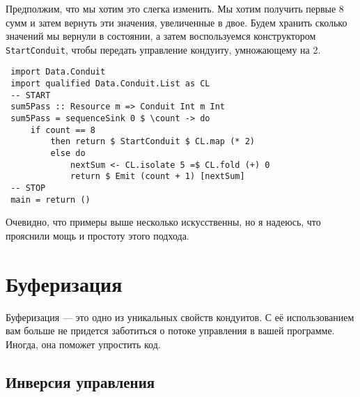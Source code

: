 Предполжим, что мы хотим это слегка изменить. Мы хотим получить первые 8 сумм и 
затем вернуть эти значения, увеличенные в двое. Будем хранить сколько значений 
мы вернули в состоянии, а затем воспользуемся конструктором 
\lstinline'StartConduit', чтобы передать управление кондуиту, умножающему на 2.
\begin{lstlisting}
 import Data.Conduit
 import qualified Data.Conduit.List as CL
 -- START
 sum5Pass :: Resource m => Conduit Int m Int
 sum5Pass = sequenceSink 0 $ \count -> do
     if count == 8
         then return $ StartConduit $ CL.map (* 2)
         else do
             nextSum <- CL.isolate 5 =$ CL.fold (+) 0
             return $ Emit (count + 1) [nextSum]
 -- STOP
 main = return ()
\end{lstlisting}
Очевидно, что примеры выше несколько искусственны, но я надеюсь, что прояснили 
мощь и простоту этого подхода. 
 
\section{Буферизация}

Буферизация --- это одно из уникальных свойств кондуитов. С её использованием 
вам больше не придется заботиться о потоке управления в вашей программе.
Иногда, она поможет упростить код.

\subsection{Инверсия управления}

